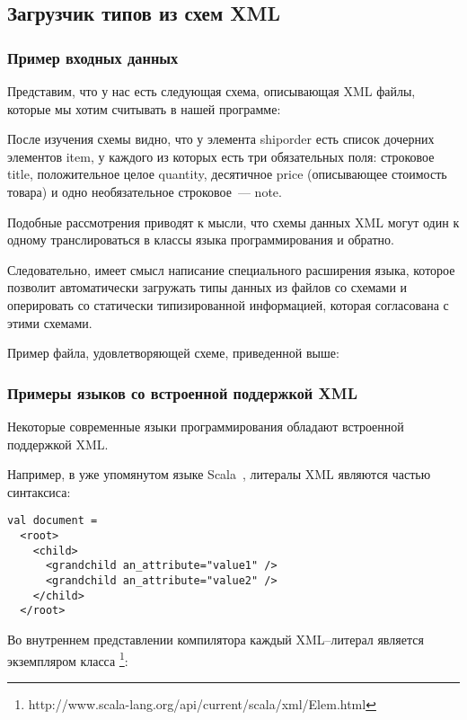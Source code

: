 \subsection{Загрузчик типов из схем XML}\label{xml-loader}

\subsubsection{Пример входных данных}

Представим, что у нас есть следующая схема, описывающая XML файлы, которые мы хотим считывать в нашей программе:


После изучения схемы видно, что у элемента shiporder есть список дочерних элементов item, у каждого из которых есть три обязательных поля: строковое title, положительное целое quantity, десятичное price (описывающее стоимость товара) и одно необязательное строковое~--- note.

Подобные рассмотрения приводят к мысли, что схемы данных XML могут один к одному транслироваться в классы языка программирования и обратно.

Следовательно, имеет смысл написание специального расширения языка, которое позволит автоматически загружать типы данных из файлов со схемами и оперировать со статически типизированной информацией, которая согласована с этими схемами.

Пример файла, удовлетворяющей схеме, приведенной выше:


\subsubsection{Примеры языков со встроенной поддержкой XML}
Некоторые современные языки программирования обладают встроенной поддержкой XML.

Например, в уже упомянутом языке Scala~\cite{scala-spec}, литералы XML являются частью синтаксиса:

\begin{lstlisting}[caption={Пример использования литералов XML в языке Scala.}, label=scala-xml-example]
val document =
  <root>
    <child>
      <grandchild an_attribute="value1" />
      <grandchild an_attribute="value2" />
    </child>
  </root>
\end{lstlisting}
Во внутреннем представлении компилятора каждый XML--литерал является экземпляром класса \footnote{http://www.scala-lang.org/api/current/scala/xml/Elem.html}:

